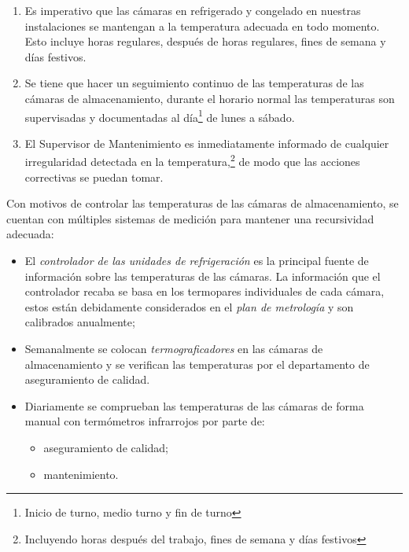 \begin{enumerate}
	\item Es imperativo que las cámaras en refrigerado y congelado en nuestras instalaciones se mantengan a la temperatura adecuada en todo momento. Esto incluye horas regulares, después de horas regulares, fines de semana y días festivos.
	\item Se tiene que hacer un seguimiento continuo de las temperaturas de las cámaras de almacenamiento, durante el horario normal las temperaturas son supervisadas y documentadas al día\footnote{Inicio de turno, medio turno y fin de turno} de lunes a sábado.
	\item El Supervisor de Mantenimiento es inmediatamente informado de cualquier irregularidad detectada en la temperatura,\footnote{Incluyendo horas después del trabajo, fines de semana y días festivos} de modo que las acciones correctivas se puedan tomar.
\end{enumerate}

\begin{note} \label{nota:MedicionDeTemperaturas}
	Con motivos de controlar las temperaturas de las cámaras de almacenamiento, se cuentan con múltiples sistemas de medición para mantener una recursividad adecuada:
	\begin{itemize}
		\item El \emph{controlador de las unidades de refrigeración} es la principal fuente de información sobre las temperaturas de las cámaras. La información que el controlador recaba se basa en los termopares individuales de cada cámara, estos están debidamente considerados en el \emph{plan de metrología} y son calibrados anualmente;
		\item Semanalmente se colocan \emph{termograficadores} en las cámaras de almacenamiento y se verifican las temperaturas por el departamento de aseguramiento de calidad.
		\item Diariamente se comprueban las temperaturas de las cámaras de forma manual con termómetros infrarrojos por parte de:
		\begin{itemize}
			\item aseguramiento de calidad;
			\item mantenimiento.
		\end{itemize}
	\end{itemize}
\end{note}

